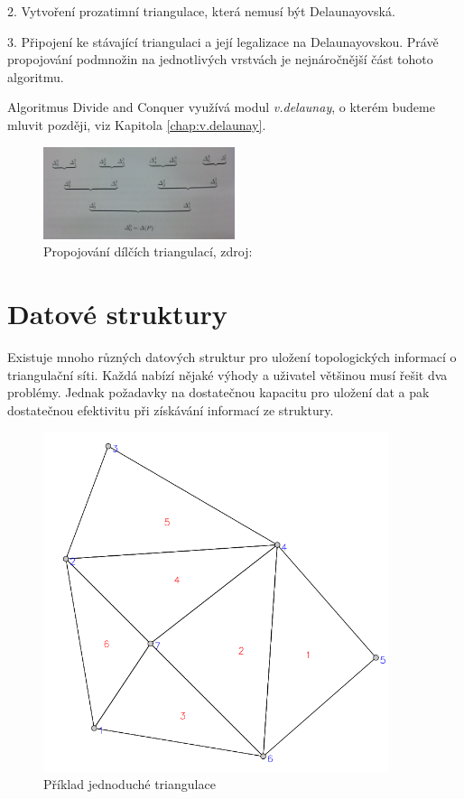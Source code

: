 \documentclass[12pt,a4paper]{article}
\begin{document}
2. Vytvoření prozatimní triangulace, která nemusí být Delaunayovská.

3. Připojení ke stávající triangulaci a její legalizace na Delaunayovskou. Právě propojování podmnožin na jednotlivých vrstvách je nejnáročnější část tohoto algoritmu.

\bigskip
Algoritmus Divide and Conquer využívá modul \emph{v.delaunay}, o kterém budeme mluvit později, viz Kapitola \ref{chap:v.delaunay}.

\newpage
\begin{figure}[h!]
\centering
\includegraphics[width=0.5\textwidth, angle=90]{img/merge.jpg}
\caption{Propojování dílčích triangulací, zdroj: \cite{triangulation}}
\label{fig:merge}
\end{figure}


\newpage
\section{Datové struktury}\label{sec:data_struct}

Existuje mnoho různých datových struktur pro uložení topologických informací o triangulační síti. Každá nabízí nějaké výhody a uživatel většinou musí řešit dva problémy. Jednak požadavky na dostatečnou kapacitu pro uložení dat a pak dostatečnou efektivitu při získávání informací ze struktury.

\begin{figure}[h!]
\centering
\includegraphics[width=0.9\textwidth]{img/struct_triangulace.png}
\caption{Příklad jednoduché triangulace}
\label{fig:struct_triangulace}
\end{figure}
\end{document}
